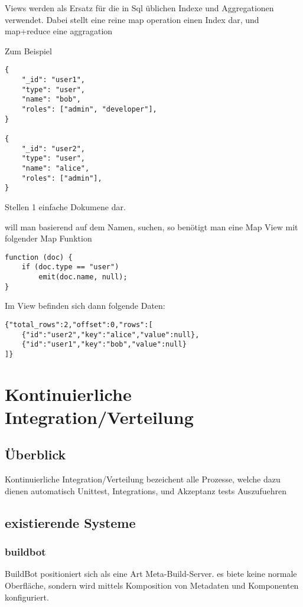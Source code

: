 Views werden als Ersatz für die in Sql üblichen Indexe und Aggregationen verwendet.
Dabei stellt eine  reine map operation einen Index dar, und map+reduce eine aggragation

\newpage
Zum Beispiel
\begin{lstlisting}
{
    "_id": "user1",
    "type": "user",
    "name": "bob",
    "roles": ["admin", "developer"],
}

{
    "_id": "user2",
    "type": "user",
    "name": "alice",
    "roles": ["admin"],
}
\end{lstlisting}


Stellen 1 einfache Dokumene dar.

will man basierend auf dem Namen, suchen, so benötigt man eine Map View mit folgender Map Funktion
\begin{lstlisting}
function (doc) {
    if (doc.type == "user")
        emit(doc.name, null);
}
\end{lstlisting}

Im View befinden sich dann folgende Daten:

\begin{lstlisting}
{"total_rows":2,"offset":0,"rows":[
    {"id":"user2","key":"alice","value":null},
    {"id":"user1","key":"bob","value":null}
]}
\end{lstlisting}



\section{Kontinuierliche Integration/Verteilung}

\subsection{Überblick}

Kontinuierliche Integration/Verteilung bezeichent alle Prozesse,
welche dazu dienen automatisch Unittest, Integrations, und Akzeptanz tests Auszufuehren


\subsection{existierende Systeme}

\subsubsection{buildbot}

BuildBot positioniert sich als eine Art Meta-Build-Server.
es biete keine normale Oberfläche, sondern wird mittels
Komposition von Metadaten und Komponenten konfiguriert.

